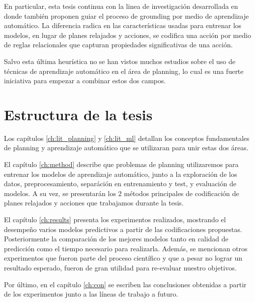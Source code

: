 En particular, esta tesis continua con la linea de investigación
desarrollada en \citep{Gnad_Torralba_Dominguez_Areces_Bustos_2019} donde también proponen guiar el proceso de grounding por medio de aprendizaje automático. La diferencia radica en las características usadas para entrenar los modelos, en lugar de planes relajados y acciones, se codifica una acción por medio de reglas relacionales que capturan propiedades significativas de una acción.

Salvo esta última heurística no se han vistos muchos estudios sobre el uso de técnicas de aprendizaje automático en el área de planning, lo cual es una fuerte iniciativa para empezar a combinar estos dos campos.

\section{Estructura de la tesis}

Los capítulos \ref{ch:lit_planning} y \ref{ch:lit_ml} detallan los conceptos
fundamentales de planning y aprendizaje automático que se utilizaran para unir
estas dos áreas.

El capítulo \ref{ch:method} describe que problemas de planning utilizaremos para entrenar los modelos de aprendizaje automático, junto a la exploración de los datos, preprocesamiento, separáción en entrenamiento y test, y evaluación de modelos. A su vez, se presentarán los 2 métodos principales de codificación de planes relajados y acciones que trabajamos durante la tesis.

El capítulo \ref{ch:results} presenta los experimentos realizados, mostrando el desempeño varios modelos predictivos a partir de las codificaciones propuestas. Posteriormente la comparación de los mejores modelos tanto en calidad de predicción como el tiempo necesario para realizarla. Además, se mencionan otros experimentos que fueron parte del proceso científico y que a pesar no lograr un resultado esperado, fueron de gran utilidad para re-evaluar nuestro objetivos.

Por último, en el capítulo \ref{ch:con} se escriben las conclusiones obtenidas a partir de
los experimentos junto a las líneas de trabajo a futuro.